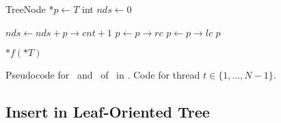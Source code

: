 \begin{algorithm}[htbp]
\begin{algorithmic}[1]
    \vspace*{1mm}
      \label{alg:ps:help:c:treenode-start}
        \State TreeNode *$\mathit{p} \gets T$
        \State int $\mathit{nds} \gets 0$
    
                \State $\mathit{nds} \gets \mathit{nds + p \rightarrow cnt + 1}$
                \State $\mathit{p} \gets p \rightarrow rc$
            \Else
                \State $\mathit{p} \gets p \rightarrow lc$
            \EndIf
        \EndWhile
        \State \Return $\mathit{p}$ \label{alg:ps:help:c:treenode-end}
    \EndProcedure
    
    \vspace*{1mm}
            \State \Return
        \EndIf
        \State {}
            \State $*f(*T)$
        \EndIf
        \State {}
    \EndProcedure
    
    \end{algorithmic}
    
    \caption{Pseudocode for \Put\ and \Traverse\ of \PS\ in \Fresh. Code for thread $t \in \{ 1, \ldots, N-1\}$.}
    \label{alg:ps}
    \end{algorithm}


    \subsection{Insert in Leaf-Oriented Tree}
    \label{sec:leaf-oriented}

